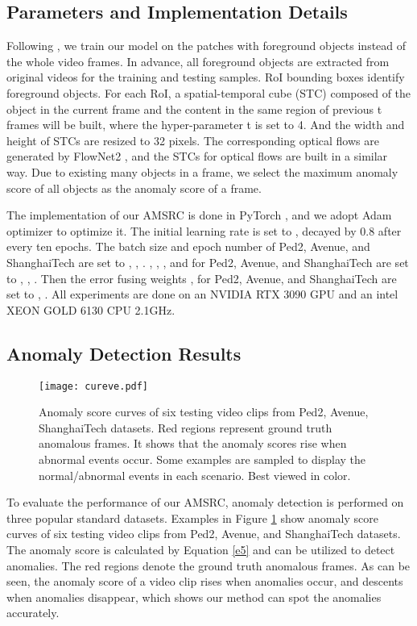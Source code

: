 \documentclass[sigconf]{acmart}
\begin{document}
\subsection{Parameters and Implementation Details}
Following \cite{liu2021hybrid, yu2020cloze}, we train our model on the patches with foreground objects instead of the whole video frames. In advance, all foreground objects are extracted from original videos for the training and testing samples. RoI bounding boxes identify foreground objects. For each RoI, a spatial-temporal cube (STC) \cite{yu2020cloze} composed of the object in the current frame and the content in the same region of previous t frames will be built, where the hyper-parameter t is set to 4. And the width and height of STCs are resized to 32 pixels. The corresponding optical flows are generated by FlowNet2 \cite{ilg2017flownet}, and the STCs for optical flows are built in a similar way. Due to existing many objects in a frame, we select the maximum anomaly score of all objects as the anomaly score of a frame.

The implementation of our AMSRC is done in PyTorch \cite{paszke2019pytorch}, and we adopt Adam optimizer \cite{kingma2014adam} to optimize it. The initial learning rate is set to , decayed by 0.8 after every ten epochs. The batch size and epoch number of Ped2, Avenue, and ShanghaiTech are set to , , . , , , and  for Ped2, Avenue, and ShanghaiTech are set to , , . Then the error fusing weights ,  for Ped2, Avenue, and ShanghaiTech are set to , . All experiments are done on an NVIDIA RTX 3090 GPU and an intel XEON GOLD 6130 CPU  2.1GHz.

\subsection{Anomaly Detection Results}
\begin{figure}[ht]
	\centering
	\texttt{[image: cureve.pdf]}
	\caption{Anomaly score curves of six testing video clips from Ped2, Avenue, ShanghaiTech datasets. Red regions represent ground truth anomalous frames. It shows that the anomaly scores rise when abnormal events occur. Some examples are sampled to display the normal/abnormal events in each scenario. Best viewed in color.}
	\label{p5}
\end{figure}

To evaluate the performance of our AMSRC, anomaly detection is performed on three popular standard datasets. Examples in Figure \ref{p5} show anomaly score curves of six testing video clips from Ped2, Avenue, and ShanghaiTech datasets. The anomaly score is calculated by Equation \ref{e5} and can be utilized to detect anomalies. The red regions denote the ground truth anomalous frames. As can be seen, the anomaly score of a video clip rises when anomalies occur, and descents when anomalies disappear, which shows our method can spot the anomalies accurately.
\end{document}
